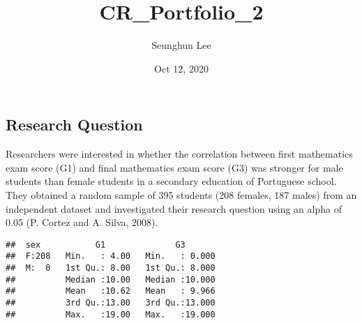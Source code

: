 \documentclass[
]{article}
\title{CR\_Portfolio\_2}
\author{Seunghun Lee}
\date{Oct 12, 2020}
\newenvironment{Shaded}{\begin{snugshade}}{\end{snugshade}}
\newcommand{\CommentTok}[1]{\textcolor[rgb]{0.56,0.35,0.01}{\textit{#1}}}
\newcommand{\DataTypeTok}[1]{\textcolor[rgb]{0.13,0.29,0.53}{#1}}
\newcommand{\KeywordTok}[1]{\textcolor[rgb]{0.13,0.29,0.53}{\textbf{#1}}}
\newcommand{\NormalTok}[1]{#1}
\newcommand{\OperatorTok}[1]{\textcolor[rgb]{0.81,0.36,0.00}{\textbf{#1}}}
\newcommand{\OtherTok}[1]{\textcolor[rgb]{0.56,0.35,0.01}{#1}}
\newcommand{\StringTok}[1]{\textcolor[rgb]{0.31,0.60,0.02}{#1}}
\begin{document}
\maketitle

{
\setcounter{tocdepth}{2}
\tableofcontents
}
\hypertarget{research-question}{%
\subsection{Research Question}\label{research-question}}

Researchers were interested in whether the correlation between first
mathematics exam score (G1) and final mathematics exam score (G3) was
stronger for male students than female students in a secondary education
of Portuguese school. They obtained a random sample of 395 students (208
females, 187 males) from an independent dataset and investigated their
research question using an alpha of 0.05 (P. Cortez and A. Silva, 2008).

\begin{Shaded}
\end{Shaded}

\begin{verbatim}
##  sex           G1              G3        
##  F:208   Min.   : 4.00   Min.   : 0.000  
##  M:  0   1st Qu.: 8.00   1st Qu.: 8.000  
##          Median :10.00   Median :10.000  
##          Mean   :10.62   Mean   : 9.966  
##          3rd Qu.:13.00   3rd Qu.:13.000  
##          Max.   :19.00   Max.   :19.000
\end{verbatim}

\begin{Shaded}
\end{Shaded}
\end{document}
